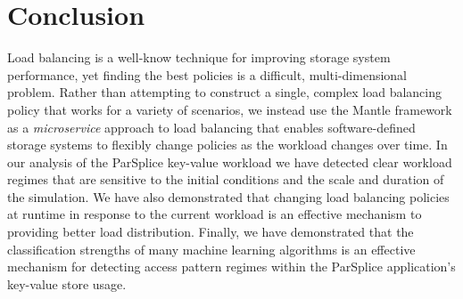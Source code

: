 \section{Conclusion}

Load balancing is a well-know technique for improving storage system
performance, yet finding the best policies is a difficult, multi-dimensional
problem. Rather than attempting to construct a single, complex load balancing
policy that works for a variety of scenarios, we instead use the Mantle
framework as a \emph{microservice} approach to load balancing that enables
software-defined storage systems to flexibly change policies as the workload
changes over time.  In our analysis of the ParSplice key-value workload we have
detected clear workload regimes that are sensitive to the initial conditions
and the scale and duration of the simulation. We have also demonstrated that
changing load balancing policies at runtime in response to the current workload
is an effective mechanism to providing better load distribution.  Finally, we
have demonstrated that the classification strengths of many machine learning
algorithms is an effective mechanism for detecting access pattern regimes
within the ParSplice application's key-value store usage.

